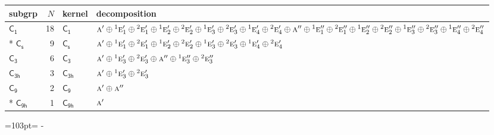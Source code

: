 \documentclass[10pt,a4paper]{article}
\newcommand{\needspace}[1]{\par\penalty-100\begingroup\dimen0=#1\relax\dimen2=\pagegoal
  \advance\dimen2-\pagetotal\ifdim\dimen0>\dimen2\relax\ifdim\dimen2>0pt\vfil\break\fi\fi
  \endgroup}
\numberwithin{equation}{section}
\newcommand{\grp}[1]{\mathsf{#1}}
\newcommand{\irr}[1]{\text{\normalfont\scshape #1}}
\newcommand{\conjpair}[1]{{}^{#1}}
\newlength{\fillwidth}\newlength{\cellwidth}\newlength{\colwidth}
\begin{document}
{\begin{longtable}{@{}lrl>{\RaggedRight\arraybackslash}p{\fillwidth}@{}}
subgrp & $N$ & kernel & decomposition\\\midrule\endhead
\bottomrule\endfoot\endlastfoot
\href{C1.pdf}{$\grp{C_{1}}$} & 18 & \href{C1.pdf}{$\grp{C_{1}}$} & $\irr{a}'\oplus \conjpair{1}\irr{e}_{1}'\oplus \conjpair{2}\irr{e}_{1}'\oplus \conjpair{1}\irr{e}_{2}'\oplus \conjpair{2}\irr{e}_{2}'\oplus \conjpair{1}\irr{e}_{3}'\oplus \conjpair{2}\irr{e}_{3}'\oplus \conjpair{1}\irr{e}_{4}'\oplus \conjpair{2}\irr{e}_{4}'\oplus \irr{a}''\oplus \conjpair{1}\irr{e}_{1}''\oplus \conjpair{2}\irr{e}_{1}''\oplus \conjpair{1}\irr{e}_{2}''\oplus \conjpair{2}\irr{e}_{2}''\oplus \conjpair{1}\irr{e}_{3}''\oplus \conjpair{2}\irr{e}_{3}''\oplus \conjpair{1}\irr{e}_{4}''\oplus \conjpair{2}\irr{e}_{4}''$\\*
\href{C1v.pdf}{$\grp{C_{s}}$} & 9 & \href{C1v.pdf}{$\grp{C_{s}}$} & $\irr{a}'\oplus \conjpair{1}\irr{e}_{1}'\oplus \conjpair{2}\irr{e}_{1}'\oplus \conjpair{1}\irr{e}_{2}'\oplus \conjpair{2}\irr{e}_{2}'\oplus \conjpair{1}\irr{e}_{3}'\oplus \conjpair{2}\irr{e}_{3}'\oplus \conjpair{1}\irr{e}_{4}'\oplus \conjpair{2}\irr{e}_{4}'$\\
\href{C3.pdf}{$\grp{C_{3}}$} & 6 & \href{C3.pdf}{$\grp{C_{3}}$} & $\irr{a}'\oplus \conjpair{1}\irr{e}_{3}'\oplus \conjpair{2}\irr{e}_{3}'\oplus \irr{a}''\oplus \conjpair{1}\irr{e}_{3}''\oplus \conjpair{2}\irr{e}_{3}''$\\
\href{C3h.pdf}{$\grp{C_{3h}}$} & 3 & \href{C3h.pdf}{$\grp{C_{3h}}$} & $\irr{a}'\oplus \conjpair{1}\irr{e}_{3}'\oplus \conjpair{2}\irr{e}_{3}'$\\
\href{C9.pdf}{$\grp{C_{9}}$} & 2 & \href{C9.pdf}{$\grp{C_{9}}$} & $\irr{a}'\oplus \irr{a}''$\\*
\href{C9h.pdf}{$\grp{C_{9h}}$} & 1 & \href{C9h.pdf}{$\grp{C_{9h}}$} & $\irr{a}'$\\
\bottomrule\end{longtable}}
\needspace{103pt}
\end{document}

